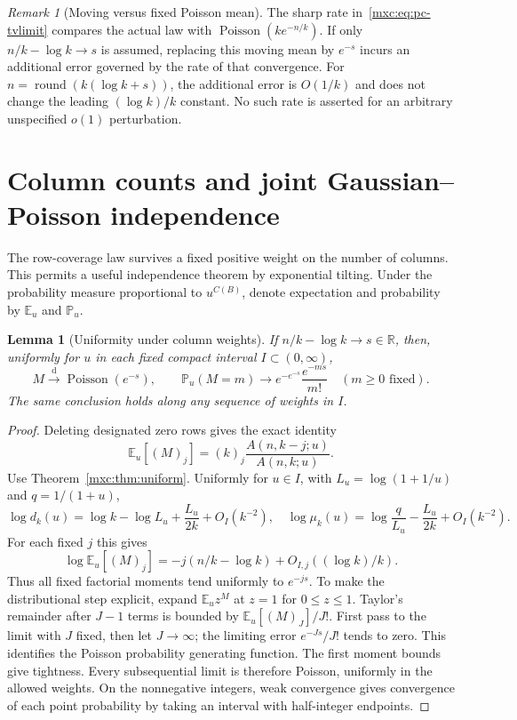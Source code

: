 \documentclass[11pt]{article}
\numberwithin{equation}{section}
\newtheorem{lemma}[theorem]{Lemma}
\theoremstyle{definition}
\theoremstyle{remark}
\newtheorem{remark}[theorem]{Remark}
\newcommand{\E}{\mathbb E}
\newcommand{\Pp}{\mathbb P}
\DeclareMathOperator{\Pois}{Poisson}
\begin{document}
\begin{remark}[Moving versus fixed Poisson mean]
The sharp rate in~\eqref{mxc:eq:pc-tvlimit} compares the actual law with
$\Pois(k e^{-n/k})$. If only $n/k-\log k\to s$ is assumed, replacing
this moving mean by $e^{-s}$ incurs an additional error governed by the
rate of that convergence. For $n=\operatorname{round}(k(\log k+s))$,
the additional error is $O(1/k)$ and does not change the leading
$(\log k)/k$ constant. No such rate is asserted for an arbitrary
unspecified $o(1)$ perturbation.
\end{remark}

\section{Column counts and joint Gaussian--Poisson independence}\label{mxc:sec:joint}

The row-coverage law survives a fixed positive weight on the number of
columns. This permits a useful independence theorem by exponential tilting.
Under the probability measure proportional to $u^{C(B)}$, denote
expectation and probability by $\E_u$ and $\Pp_u$.

\begin{lemma}[Uniformity under column weights]\label{mxc:lem:weighted-poisson}
If $n/k-\log k\to s\in\mathbb R$, then, uniformly for $u$ in each
fixed compact interval $I\subset(0,\infty)$,
\[
 M\xrightarrow{\mathrm d}\Pois(e^{-s}),\qquad
 \Pp_u(M=m)\longrightarrow e^{-e^{-s}}\frac{e^{-ms}}{m!}
 \quad(m\ge0\text{ fixed}).
\]
The same conclusion holds along any sequence of weights in $I$.
\end{lemma}
\begin{proof}
Deleting designated zero rows gives the exact identity
\[
 \E_u[(M)_j]=(k)_j\frac{A(n,k-j;u)}{A(n,k;u)}.
\]
Use Theorem~\ref{mxc:thm:uniform}. Uniformly for $u\in I$, with
$L_u=\log(1+1/u)$ and $q=1/(1+u)$,
\[
 \log d_k(u)=\log k-\log L_u+\frac{L_u}{2k}+O_I(k^{-2}),
 \quad
 \log\mu_k(u)=\log\frac{q}{L_u}-\frac{L_u}{2k}+O_I(k^{-2}).
\]
For each fixed $j$ this gives
\[
 \log\E_u[(M)_j]=-j(n/k-\log k)+O_{I,j}((\log k)/k).
\]
Thus all fixed factorial moments tend uniformly to $e^{-js}$.
To make the distributional step explicit, expand $\E_u z^M$ at $z=1$
for $0\le z\le1$. Taylor's remainder after $J-1$ terms is bounded
by $\E_u[(M)_J]/J!$. First pass to the limit with $J$ fixed, then
let $J\to\infty$; the limiting error $e^{-Js}/J!$ tends to zero.
This identifies the Poisson probability generating function. The first
moment bounds give tightness. Every subsequential limit is therefore
Poisson, uniformly in the allowed weights. On the nonnegative integers,
weak convergence gives convergence of each point probability by taking
an interval with half-integer endpoints.
\end{proof}
\end{document}
